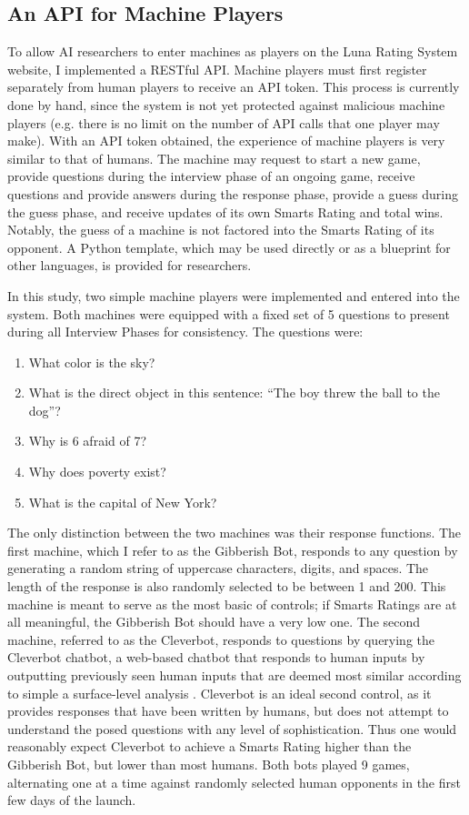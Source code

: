 \subsection{An API for Machine Players}

To allow AI researchers to enter machines as players on the Luna Rating System website, I implemented a RESTful API. Machine players must first register separately from human players to receive an API token. This process is currently done by hand, since the system is not yet protected against malicious machine players (e.g. there is no limit on the number of API calls that one player may make). With an API token obtained, the experience of machine players is very similar to that of humans. The machine may request to start a new game, provide questions during the interview phase of an ongoing game, receive questions and provide answers during the response phase, provide a guess during the guess phase, and receive updates of its own Smarts Rating and total wins. Notably, the guess of a machine is not factored into the Smarts Rating of its opponent. A Python template, which may be used directly or as a blueprint for other languages, is provided for researchers. 

In this study, two simple machine players were implemented and entered into the system. Both machines were equipped with a fixed set of 5 questions to present during all Interview Phases for consistency. The questions were:

\begin{enumerate}
\item What color is the sky?
\item What is the direct object in this sentence: ``The boy threw the ball to the dog''? 
\item Why is 6 afraid of 7?
\item Why does poverty exist?
\item What is the capital of New York?
\end{enumerate}

The only distinction between the two machines was their response functions. The first machine, which I refer to as the Gibberish Bot, responds to any question by generating a random string of uppercase characters, digits, and spaces. The length of the response is also randomly selected to be between 1 and 200. This machine is meant to serve as the most basic of controls; if Smarts Ratings are at all meaningful, the Gibberish Bot should have a very low one. The second machine, referred to as the Cleverbot, responds to questions by querying the Cleverbot chatbot, a web-based chatbot that responds to human inputs by outputting previously seen human inputs that are deemed most similar according to simple a surface-level analysis \cite{carpenter2015cleverbot}. Cleverbot is an ideal second control, as it provides responses that have been written by humans, but does not attempt to understand the posed questions with any level of sophistication. Thus one would reasonably expect Cleverbot to achieve a Smarts Rating higher than the Gibberish Bot, but lower than most humans. Both bots played 9 games, alternating one at a time against randomly selected human opponents in the first few days of the launch.

